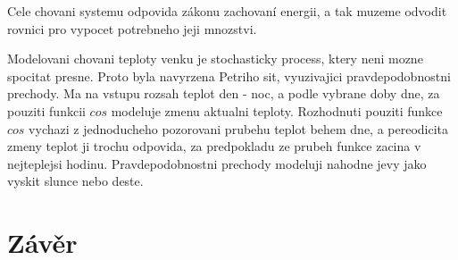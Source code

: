 Cele chovani systemu odpovida zákonu zachovaní energii, a tak muzeme odvodit rovnici pro vypocet potrebneho jeji mnozstvi.

Modelovani chovani teploty venku je stochasticky process, ktery neni mozne spocitat presne. Proto byla navyrzena Petriho sit, vyuzivajici pravdepodobnostni prechody. Ma na vstupu rozsah teplot den - noc, a podle vybrane doby dne, za pouziti funkcii $cos$ modeluje zmenu aktualni teploty. Rozhodnuti pouziti funkce $cos$ vychazi z jednoducheho pozorovani prubehu teplot behem dne, a pereodicita zmeny teplot ji trochu odpovida, za predpokladu ze prubeh funkce zacina v nejteplejsi hodinu. %
Pravdepodobnostni prechody modeluji nahodne jevy jako vyskit slunce nebo deste.


\chapter{Závěr}
\label{zaver}
